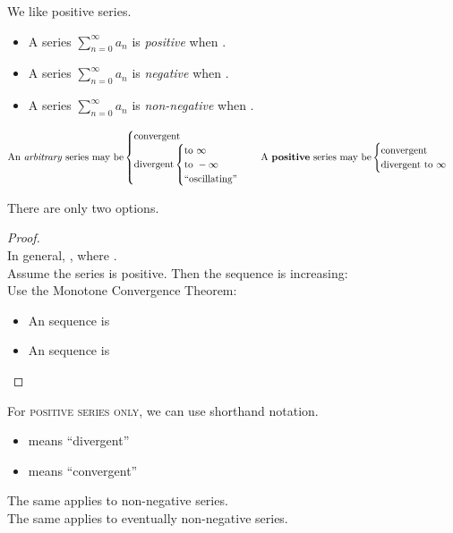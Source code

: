 \documentclass[../13.tex]{subfiles}
\begin{document}
We like positive series. \begin{itemize}
    \item A series \(\sum_{n = 0}^{\infty} a_n\) is \emph{positive} when .
    \item A series \(\sum_{n = 0}^{\infty} a_n\) is \emph{negative} when .
    \item A series \(\sum_{n = 0}^{\infty} a_n\) is \emph{non-negative} when .
\end{itemize}
\begin{align*}
    \text{An \emph{arbitrary} series may be} \begin{cases}
        \text{convergent} \\
        \text{divergent} \begin{cases}
            \text{to } \infty  \\
            \text{to } -\infty \\
            \text{``oscillating''}
        \end{cases}
    \end{cases}
    \text{A \textbf{positive} series may be} \begin{cases}
        \text{convergent} \\
        \text{divergent to } \infty
    \end{cases}
\end{align*}

There are only two options. \begin{proof}
    ~\\
    In general, , \DS{\quad } where .\\
    Assume the series  is positive. Then the sequence  is increasing:   \\
    Use the Monotone Convergence Theorem: \begin{itemize}
        \item An  sequence is 
        \item An  sequence is 
    \end{itemize}
\end{proof}
For \textsc{positive series only}, we can use shorthand notation.
\begin{itemize}
    \item {} means ``divergent''
    \item {} means ``convergent''
\end{itemize}
The same applies to non-negative series. \\
The same applies to eventually non-negative series.
\end{document}
